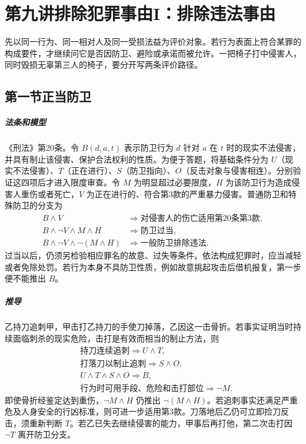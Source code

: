 \chapter{第九讲\quad 排除犯罪事由I：排除违法事由}
\label{lecture:09}
\par

先以同一行为、同一相对人及同一受损法益为评价对象。若行为表面上符合某罪的构成要件，才继续问它是否因防卫、避险或承诺而被允许。一把椅子打中侵害人，同时毁损无辜第三人的椅子，要分开写两条评价路径。

\section{第一节\quad 正当防卫}

\paragraph{法条和模型}
《刑法》第20条。令 \(B(d,a,t)\) 表示防卫行为 \(d\) 针对 \(a\) 在 \(t\) 时的现实不法侵害，并具有制止该侵害、保护合法权利的性质。为便于答题，将基础条件分为 \(U\)（现实不法侵害）、\(T\)（正在进行）、\(S\)（防卫指向）、\(O\)（反击对象与侵害相连）。分别验证这四项后才进入限度审查。令 \(M\) 为明显超过必要限度，\(H\) 为该防卫行为造成侵害人重伤或者死亡，\(V\) 为正在进行的、符合第3款的严重暴力侵害。普通防卫和特殊防卫的分支为
\[
\begin{aligned}
B\land V &\Longrightarrow \text{对侵害人的伤亡适用第20条第3款},\\
B\land\neg V\land M\land H &\Longrightarrow \text{防卫过当},\\
B\land\neg V\land\neg(M\land H)&\Longrightarrow \text{一般防卫排除违法}.
\end{aligned}
\]
过当以后，仍须另检验相应罪名的故意、过失等条件。依法构成犯罪时，应当减轻或者免除处罚。若行为本身不具防卫性质，例如故意挑起攻击后借机报复，第一步便不能推出 \(B\)。

\paragraph{推导}
乙持刀追刺甲，甲击打乙持刀的手使刀掉落，乙因这一击骨折。若事实证明当时持续面临刺杀的现实危险，击打是有效而相当的制止方法，则
\[
\begin{aligned}
&\text{持刀连续追刺}\Longrightarrow U\land T,\\
&\text{打落刀以制止追刺}\Longrightarrow S\land O,\\
&U\land T\land S\land O\Longrightarrow B,\\
&\text{行为时可用手段、危险和击打部位}\Longrightarrow \neg M.
\end{aligned}
\]
即使骨折经鉴定达到重伤，\(\neg M\land H\) 仍推出 \(\neg(M\land H)\)。若追刺事实还满足严重危及人身安全的行凶标准，则可进一步适用第3款。刀落地后乙仍可立即捡刀反击，须重新判断 \(T\)。若乙已失去继续侵害的能力，甲事后再打他，第二次击打因 \(\neg T\) 离开防卫分支。

